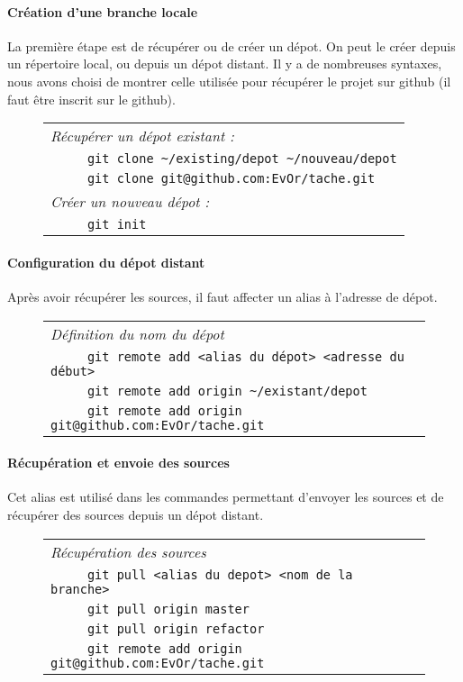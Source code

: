 \paragraph{Création d'une branche locale}
La première étape est de récupérer ou de créer un dépot. On peut le créer depuis un répertoire local, ou depuis un dépot distant. Il y a de nombreuses syntaxes, nous avons choisi de montrer celle utilisée pour récupérer le projet sur github (il faut être inscrit sur le github).

\begin{figure}[H]
      \begin{tabular}{l}
	\textit{Récupérer un dépot existant :} \\
        \verb|     git clone ~/existing/depot ~/nouveau/depot|\\
	\verb|     git clone git@github.com:EvOr/tache.git|\\
	\textit{Créer un nouveau dépot :}\\
	\verb|     git init|\\
      \end{tabular}
\end{figure}

\paragraph{Configuration du dépot distant} Après avoir récupérer les sources, il faut affecter un alias à l'adresse de dépot.

\begin{figure}[H]
      \begin{tabular}{l}
	\textit{Définition du nom du dépot}\\
	\verb|     git remote add <alias du dépot> <adresse du début>|\\
	\verb|     git remote add origin ~/existant/depot|\\
	\verb|     git remote add origin git@github.com:EvOr/tache.git|\\
      \end{tabular}
\end{figure}

\paragraph{Récupération et envoie des sources} Cet alias est utilisé dans les commandes permettant d'envoyer les sources et de récupérer des sources depuis un dépot distant.

\begin{figure}[H]
      \begin{tabular}{l}
	\textit{Récupération des sources}\\
	\verb|     git pull <alias du depot> <nom de la branche>|\\
	\verb|     git pull origin master|\\
	\verb|     git pull origin refactor|\\
	\verb|     git remote add origin git@github.com:EvOr/tache.git|\\
      \end{tabular}
\end{figure}

